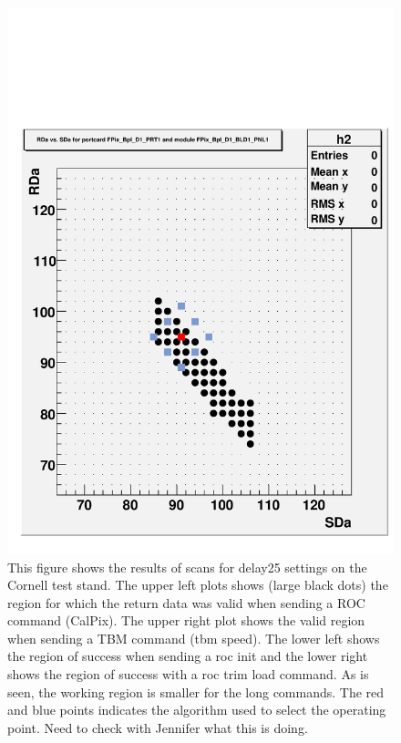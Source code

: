 \begin{figure}
\begin{center}
\includegraphics[width=0.48\linewidth]{graph_FPix_BpI_D1_PRT1_FPix_BpI_D1_BLD1_PNL1_3}
\end{center}
\caption{This figure shows the results of scans for delay25 settings on the Cornell test stand. The upper left plots shows (large black dots) the region for which the return data was valid when sending a ROC command (CalPix). The upper right plot shows the valid region when sending a TBM command (tbm speed). The lower left shows the region of success when sending a roc init and the lower right shows the region of success with a roc trim load command. As is seen, the working region is smaller for the long commands. The red and blue points indicates the algorithm used to select the operating point. Need to check with Jennifer what this is doing.}
\label{fig:scanDelay25}
\end{figure}

